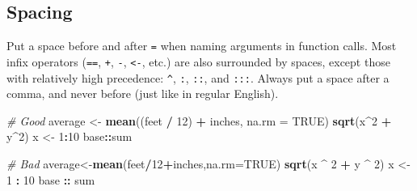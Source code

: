 \documentclass[]{book}
\newenvironment{Shaded}{\begin{snugshade}}{\end{snugshade}}
\newcommand{\KeywordTok}[1]{\textcolor[rgb]{0.13,0.29,0.53}{\textbf{#1}}}
\newcommand{\DataTypeTok}[1]{\textcolor[rgb]{0.13,0.29,0.53}{#1}}
\newcommand{\DecValTok}[1]{\textcolor[rgb]{0.00,0.00,0.81}{#1}}
\newcommand{\StringTok}[1]{\textcolor[rgb]{0.31,0.60,0.02}{#1}}
\newcommand{\CommentTok}[1]{\textcolor[rgb]{0.56,0.35,0.01}{\textit{#1}}}
\newcommand{\OtherTok}[1]{\textcolor[rgb]{0.56,0.35,0.01}{#1}}
\newcommand{\OperatorTok}[1]{\textcolor[rgb]{0.81,0.36,0.00}{\textbf{#1}}}
\newcommand{\NormalTok}[1]{#1}
\theoremstyle{definition}
\theoremstyle{definition}
\theoremstyle{definition}
\theoremstyle{remark}
\begin{document}
\begin{Shaded}
\end{Shaded}

\subsection{Spacing}\label{spacing}

Put a space before and after \texttt{=} when naming arguments in
function calls. Most infix operators (\texttt{==}, \texttt{+},
\texttt{-}, \texttt{\textless{}-}, etc.) are also surrounded by spaces,
except those with relatively high precedence: \texttt{\^{}}, \texttt{:},
\texttt{::}, and \texttt{:::}. Always put a space after a comma, and
never before (just like in regular English).

\begin{Shaded}
\begin{Highlighting}[]
\CommentTok{# Good}
\NormalTok{average <-}\StringTok{ }\KeywordTok{mean}\NormalTok{((feet }\OperatorTok{/}\StringTok{ }\DecValTok{12}\NormalTok{) }\OperatorTok{+}\StringTok{ }\NormalTok{inches, }\DataTypeTok{na.rm =} \OtherTok{TRUE}\NormalTok{)}
\KeywordTok{sqrt}\NormalTok{(x}\OperatorTok{^}\DecValTok{2} \OperatorTok{+}\StringTok{ }\NormalTok{y}\OperatorTok{^}\DecValTok{2}\NormalTok{)}
\NormalTok{x <-}\StringTok{ }\DecValTok{1}\OperatorTok{:}\DecValTok{10}
\NormalTok{base}\OperatorTok{::}\NormalTok{sum}

\CommentTok{# Bad}
\NormalTok{average<-}\KeywordTok{mean}\NormalTok{(feet}\OperatorTok{/}\DecValTok{12}\OperatorTok{+}\NormalTok{inches,}\DataTypeTok{na.rm=}\OtherTok{TRUE}\NormalTok{)}
\KeywordTok{sqrt}\NormalTok{(x }\OperatorTok{^}\StringTok{ }\DecValTok{2} \OperatorTok{+}\StringTok{ }\NormalTok{y }\OperatorTok{^}\StringTok{ }\DecValTok{2}\NormalTok{)}
\NormalTok{x <-}\StringTok{ }\DecValTok{1} \OperatorTok{:}\StringTok{ }\DecValTok{10}
\NormalTok{base }\OperatorTok{::}\StringTok{ }\NormalTok{sum}
\end{Highlighting}
\end{Shaded}
\end{document}
